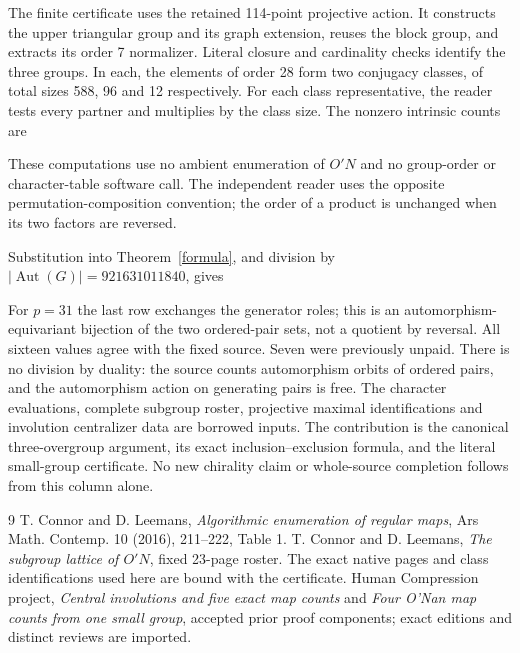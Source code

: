 \documentclass[11pt,a4paper]{article}
\begin{document}
The finite certificate uses the retained 114-point projective action.
It constructs the upper triangular group and its graph extension,
reuses the block group, and extracts its order 7 normalizer. Literal
closure and cardinality checks identify the three groups. In each,
the elements of order 28 form two conjugacy classes, of total sizes
588, 96 and 12 respectively. For each class representative, the reader
tests every partner and multiplies by the class size. The nonzero
intrinsic counts are

These computations use no ambient enumeration of $O'N$ and no group-order
or character-table software call. The independent reader uses the
opposite permutation-composition convention; the order of a product
is unchanged when its two factors are reversed.

Substitution into Theorem~\ref{formula}, and division by
$|\operatorname{Aut}(G)|=921631011840$, gives

For $p=31$ the last row exchanges the generator roles; this is an
automorphism-equivariant bijection of the two ordered-pair sets, not a
quotient by reversal. All sixteen values agree with the fixed source. Seven were previously
unpaid. There is no division by duality: the source counts automorphism
orbits of ordered pairs, and the automorphism action on generating
pairs is free. The character evaluations, complete subgroup roster,
projective maximal identifications and involution centralizer data are
borrowed inputs. The contribution is the canonical three-overgroup
argument, its exact inclusion--exclusion formula, and the literal
small-group certificate. No new chirality claim or whole-source
completion follows from this column alone.

\begin{thebibliography}{9}
 T. Connor and D. Leemans, \emph{Algorithmic enumeration
of regular maps}, Ars Math. Contemp. 10 (2016), 211--222, Table 1.
 T. Connor and D. Leemans, \emph{The subgroup lattice
of $O'N$}, fixed 23-page roster. The exact native pages and class
identifications used here are bound with the certificate.
 Human Compression project, \emph{Central involutions
and five exact map counts} and \emph{Four O'Nan map counts from one small group}, accepted prior proof components; exact editions and
distinct reviews are imported.
\end{thebibliography}
\end{document}
